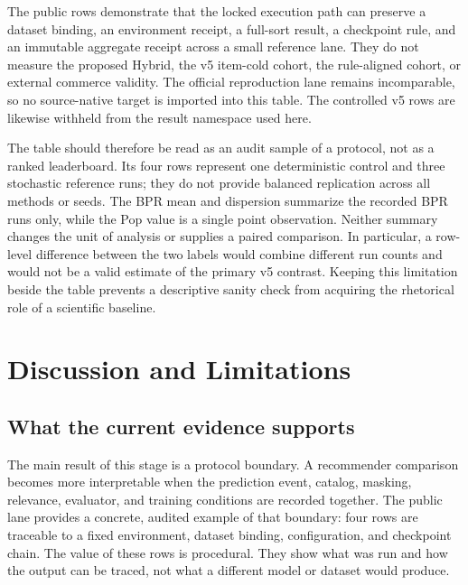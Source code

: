 \documentclass[10pt,a4paper]{article}
\begin{document}
The public rows demonstrate that the locked execution path can preserve a
dataset binding, an environment receipt, a full-sort result, a checkpoint rule,
and an immutable aggregate receipt across a small reference lane. They do not
measure the proposed Hybrid, the v5 item-cold cohort, the rule-aligned cohort,
or external commerce validity. The official reproduction lane remains
incomparable, so no source-native target is imported into this table. The
controlled v5 rows are likewise withheld from the result namespace used here.

The table should therefore be read as an audit sample of a protocol, not as a
ranked leaderboard. Its four rows represent one deterministic control and
three stochastic reference runs; they do not provide balanced replication
across all methods or seeds. The BPR mean and dispersion summarize the
recorded BPR runs only, while the Pop value is a single point observation.
Neither summary changes the unit of analysis or supplies a paired comparison.
In particular, a row-level difference between the two labels would combine
different run counts and would not be a valid estimate of the primary v5
contrast. Keeping this limitation beside the table prevents a descriptive
sanity check from acquiring the rhetorical role of a scientific baseline.

\section{Discussion and Limitations}

\subsection{What the current evidence supports}

The main result of this stage is a protocol boundary. A recommender comparison
becomes more interpretable when the prediction event, catalog, masking,
relevance, evaluator, and training conditions are recorded together. The
public lane provides a concrete, audited example of that boundary: four rows
are traceable to a fixed environment, dataset binding, configuration, and
checkpoint chain. The value of these rows is procedural. They show what was run
and how the output can be traced, not what a different model or dataset would
produce.
\end{document}
